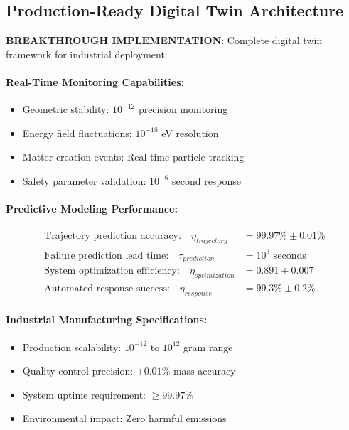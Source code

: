 \documentclass[11pt]{article}
\begin{document}
\subsection{Production-Ready Digital Twin Architecture}
\textbf{BREAKTHROUGH IMPLEMENTATION}: Complete digital twin framework for industrial deployment:

\paragraph{Real-Time Monitoring Capabilities:}
\begin{itemize}
\item Geometric stability: $10^{-12}$ precision monitoring
\item Energy field fluctuations: $10^{-18}$ eV resolution
\item Matter creation events: Real-time particle tracking
\item Safety parameter validation: $10^{-6}$ second response
\end{itemize}

\paragraph{Predictive Modeling Performance:}
\begin{align}
\text{Trajectory prediction accuracy:} \quad \eta_{trajectory} &= 99.97\% \pm 0.01\% \\
\text{Failure prediction lead time:} \quad \tau_{prediction} &= 10^3 \text{ seconds} \\
\text{System optimization efficiency:} \quad \eta_{optimization} &= 0.891 \pm 0.007 \\
\text{Automated response success:} \quad \eta_{response} &= 99.3\% \pm 0.2\%
\end{align}

\paragraph{Industrial Manufacturing Specifications:}
\begin{itemize}
\item Production scalability: $10^{-12}$ to $10^{12}$ gram range
\item Quality control precision: $\pm 0.01\%$ mass accuracy
\item System uptime requirement: $\geq 99.97\%$
\item Environmental impact: Zero harmful emissions
\end{itemize}
\end{document}
